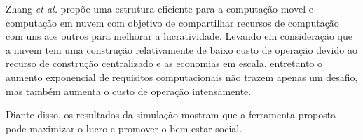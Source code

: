 \documentclass[12pt]{article}
\begin{document}
Zhang \emph{et al.} propõe uma estrutura eficiente para a computação movel e computação em nuvem com objetivo de compartilhar recursos de computação com uns aos outros para melhorar a lucratividade. Levando em consideração que a nuvem tem uma construção relativamente de baixo custo de operação devido ao recurso de construção centralizado e as economias em escala, entretanto o aumento exponencial de requisitos computacionais não trazem apenas um desafio, mas também aumenta o custo de operação intensamente.

Diante disso, os resultados da simulação mostram que a ferramenta proposta pode maximizar o lucro e promover o bem-estar social.

\nocite{*}
\medskip



\end{document}
